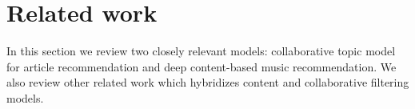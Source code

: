 \section{Related work}\label{chpt:content:sec:related}

In this section we review two closely relevant models: collaborative topic model for article recommendation and deep content-based music recommendation. We also review other related work which hybridizes content and collaborative filtering models.  


